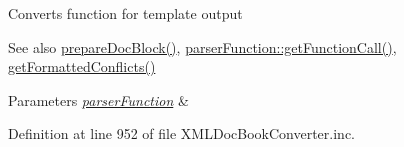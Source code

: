 \-Converts function for template output \begin{DoxySeeAlso}{\-See also}
\hyperlink{class_x_m_l_doc_book_converter_a51865de1c35df577a5f62a586a9eebcd}{prepare\-Doc\-Block()}, \hyperlink{classparser_function_a5ef78d1a821ab72d3d3cfb761df1b0fe}{parser\-Function\-::get\-Function\-Call()}, \hyperlink{class_converter_a98a524a574359a7614e4615ce723053a}{get\-Formatted\-Conflicts()} 
\end{DoxySeeAlso}

\begin{DoxyParams}{\-Parameters}
{\em \hyperlink{classparser_function}{parser\-Function}} & \\
\hline
\end{DoxyParams}


\-Definition at line 952 of file \-X\-M\-L\-Doc\-Book\-Converter.\-inc.


